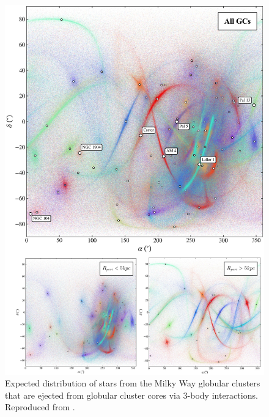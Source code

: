             \begin{figure}
                \includegraphics[width=\linewidth]{images/grondin_et_al_core_spray.jpeg}
                \caption{Expected distribution of stars from the Milky Way globular clusters that are ejected from globular cluster cores via 3-body interactions. Reproduced from \citet{2024MNRAS.528.5189G}.}
                \label{fig:grondin_et_al_core_spray}
            \end{figure}            
